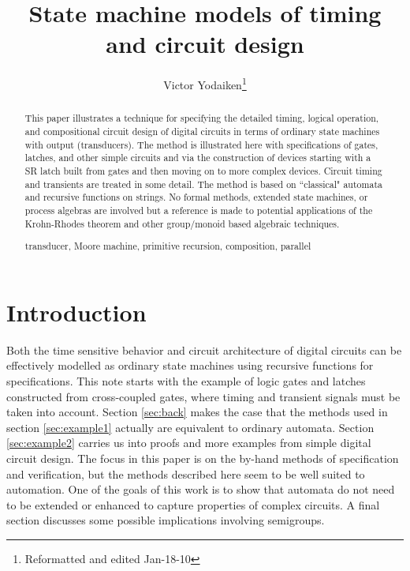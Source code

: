 \documentclass[runningheads,letter]{llncs}
\newcommand{\keywords}[1]{\par\addvspace\baselineskip
\noindent\keywordname\enspace\ignorespaces#1}
\begin{document}
\mainmatter  

\title{State machine models of timing and circuit design}


\author{Victor Yodaiken\thanks{Reformatted and edited Jan-18-10 }
}





\maketitle


\begin{abstract}
This paper illustrates a technique for specifying
the detailed timing, logical operation, and compositional circuit design
of digital circuits in terms of ordinary state machines with output
(transducers). The method is illustrated here with specifications
of gates, latches, and other simple circuits and via the construction of
devices starting with a SR latch built
from gates and then moving on to more complex devices.
Circuit timing and transients are
treated in some detail.
The method is based on ``classical" automata and recursive functions on strings.
No formal methods, extended state machines,
or process algebras are involved but a reference is made
to potential applications of the Krohn-Rhodes theorem and other group/monoid
based algebraic techniques. 
\keywords{ transducer, Moore machine, primitive recursion, composition, parallel}
\end{abstract}


\section{Introduction}

Both the time sensitive behavior and circuit architecture of 
digital circuits can be effectively modelled as ordinary state machines using
recursive functions for specifications. This note starts with the example of
logic gates and latches constructed from cross-coupled gates, where timing
and transient signals must be taken into account. Section \ref{sec:back} makes
the case that the methods used in section \ref{sec:example1} actually are
equivalent to ordinary automata. Section \ref{sec:example2} carries us
into proofs and more
examples from simple digital circuit design. The focus in this paper is on the by-hand 
methods of specification and verification, but the methods described here seem
to be well suited to automation. One of the goals of this work is to show that 
automata do not need to be extended or enhanced to capture 
properties of complex circuits. A final section discusses some possible implications involving semigroups.
\end{document}
